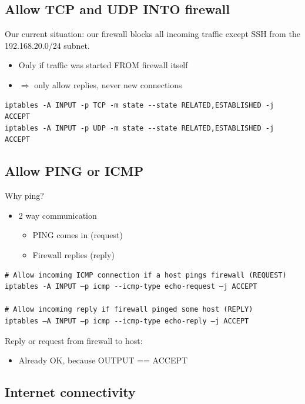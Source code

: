 \documentclass{article}
\begin{document}
\subsection{Allow TCP and UDP INTO firewall}

Our current situation: our firewall blocks all incoming traffic except SSH from the 192.168.20.0/24 subnet.

\begin{itemize}
    \item Only if traffic was started FROM firewall itself
    \item $\Rightarrow$ only allow replies, never new connections
\end{itemize}

\begin{verbatim}
iptables -A INPUT -p TCP -m state --state RELATED,ESTABLISHED -j ACCEPT
iptables -A INPUT -p UDP -m state --state RELATED,ESTABLISHED -j ACCEPT
\end{verbatim}

\subsection{Allow PING or ICMP}

Why ping?

\begin{itemize}
    \item 2 way communication
    \begin{itemize}
        \item PING comes in (request)
        \item Firewall replies (reply)
    \end{itemize}
\end{itemize}

\begin{verbatim}
# Allow incoming ICMP connection if a host pings firewall (REQUEST)
iptables -A INPUT –p icmp --icmp-type echo-request –j ACCEPT

# Allow incoming reply if firewall pinged some host (REPLY)
iptables –A INPUT –p icmp --icmp-type echo-reply –j ACCEPT
\end{verbatim}

Reply or request from firewall to host:

\begin{itemize}
    \item Already OK, because OUTPUT == ACCEPT
\end{itemize}

\subsection{Internet connectivity}
\end{document}
